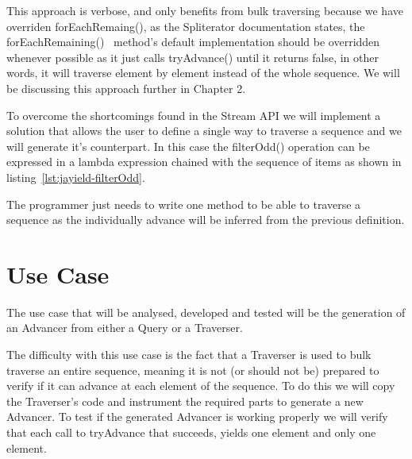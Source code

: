 


This approach is verbose, and only benefits from bulk traversing because we have overriden forEachRemaing(), as the Spliterator documentation states, the forEachRemaining()~\citep{spliterator} method's default implementation should be overridden whenever possible as it just calls tryAdvance() until it returns false, in other words, it will traverse element by element instead of the whole sequence. We will be discussing this approach further in Chapter 2. 

To overcome the shortcomings found in the Stream API we will implement a solution that allows the user to define a single way to traverse a sequence and we will generate it's counterpart. In this case the filterOdd() operation can be expressed in a lambda expression chained with the sequence of items as shown in listing~\ref{lst:jayield-filterOdd}.



The programmer just needs to write one method to be able to traverse a sequence as the individually advance will be inferred from the previous definition.


\section{Use Case}
The use case that will be analysed, developed and tested will be the generation of an Advancer from either a Query or a Traverser.

The difficulty with this use case is the fact that a Traverser is used to bulk traverse an entire sequence, meaning it is not (or should not be) prepared to verify if it can advance at each element of the sequence. To do this we will copy the Traverser's code and instrument the required parts to generate a new Advancer. To test if the generated Advancer is working properly we will verify that each call to tryAdvance that succeeds, yields one element and only one element.
